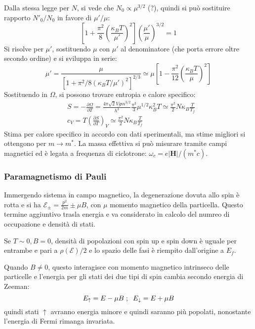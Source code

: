 \documentclass[10pt, a4paper]{scrartcl}
\numberwithin{equation}{subsection}
\theoremstyle{style1}
\begin{document}
Dalla stessa legge per $N$, si vede che $N_0 \propto \mu ^{3 / 2} $ ({\color{red}?}), quindi si pu\`o sostituire rapporto $N'_0 / N_0$ in favore di $\mu ' / \mu $:
\[
\left[ 1+ \frac{\pi^2}{8}\left(\frac{\kappa _B T}{\mu '}\right) ^2 \right] \left(\frac{\mu '}{\mu }\right) ^{3 / 2} =1
\] 
Si risolve per $\mu '$, sostituendo $\mu $ con $\mu '$ al denominatore (che porta errore oltre secondo ordine) e si sviluppa in serie:
\[
\mu ' = \frac{\mu }{\left[ 1 + \pi^2 / 8 (\kappa _B T / \mu ')^2 \right] ^{2 / 3} }\simeq \mu \left[ 1 - \frac{\pi^2}{12} \left(\frac{\kappa _B T}{\mu }\right) ^2 \right] 
\] 
Sostituendo in $\Omega $, si possono trovare entropia e calore specifico:
\[
\begin{split}
	&S = -\frac{\partial \Omega }{\partial T}  = \frac{4 \pi \sqrt{2} V g m^{3 / 2} }{h^3}\frac{\pi^2 }{3}\mu ^{1 / 2} \kappa _B^2 T \simeq \frac{\pi^2}{2} N \kappa _B \frac{T}{T_f}\\
	&c_V = T \left(\frac{\partial S}{\partial T} \right) _V \simeq \frac{\pi^2}{ 2} N\kappa _B \frac{T}{T_f}
\end{split}
\] 
Stima per calore specifico in accordo con dati sperimentali, ma stime migliori si ottengono per $m\to m^*$. 
La massa effettiva si pu\`o misurare tramite campi magnetici ed \`e legata a frequenza di ciclotrone: $\omega_c = e \lvert \mathbf{H}  \rvert / (m^* c)$.

\subsubsection{Paramagnetismo di Pauli}

Immergendo sistema in campo magnetico, la degenerazione dovuta allo spin \`e rotta e si ha $\mathscr{E}_{\pm} = \frac{p^2}{2m} \pm \mu B$, con $\mu $ momento magnetico della particella.
Questo termine aggiuntivo trasla energia e va considerato in calcolo del numreo di occupazione e densit\`a di stati.

Se $T\sim 0 , B=0$, densit\`a di popolazioni con spin up e spin down \`e uguale per entrambe e pari a $\rho (\mathscr{E}) / 2$ e lo spazio delle fasi \`e riempito dall'origine a $E_f$. 

Quando $B \neq 0 $, questo interagisce con momento magnetico intrinseco delle particelle e l'energia per gli stati dei due tipi di spin cambia secondo energia di Zeeman:
\[
	E_\uparrow = E - \mu  B \hspace{.1cm} ; \hspace{.2cm} E _\downarrow = E + \mu B
\] 
quindi stati $\uparrow$ avranno energia minore e quindi saranno pi\`u popolati, nonostante l'energia di Fermi rimanga invariata.
\end{document}
